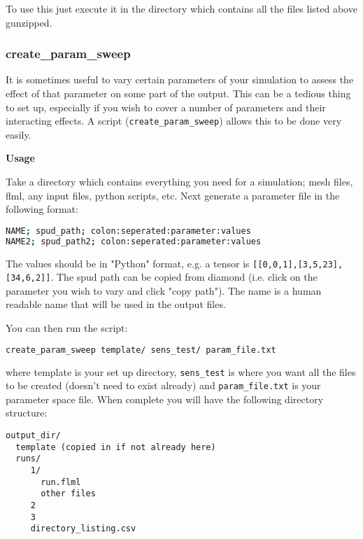 To use this just execute it in the directory which contains all the files listed above gunzipped.

\subsubsection{create\_param\_sweep}
\label{sec:create_param_sweep}

It is sometimes useful to vary certain parameters of your simulation to assess the effect of 
that parameter on some part of the output. This can be a tedious thing to set up, especially 
if you wish to cover a number of parameters and their interacting effects.
A script (\lstinline[language = Bash]+create_param_sweep+) allows this to be done very easily.

\textbf{Usage}

Take a directory which contains everything you need for a simulation; mesh files, 
flml, any input files, python scripts, etc. Next generate a parameter file in the following format:

\begin{lstlisting}[language = Bash]
NAME; spud_path; colon:seperated:parameter:values
NAME2; spud_path2; colon:seperated:parameter:values
\end{lstlisting}

The values should be in "Python" format, e.g. a tensor is 
\lstinline[language = Bash]+[[0,0,1],[3,5,23],[34,6,2]]+. 
The spud path can be copied from diamond (i.e. click on the parameter you wish to vary
and click "copy path"). The name is a human readable name that will be used in the output files.

You can then run the script:

\begin{lstlisting}[language = Bash]
create_param_sweep template/ sens_test/ param_file.txt 
\end{lstlisting}

where template is your set up directory, \lstinline[language = Bash]+sens_test+ 
is where you want all the files to be created 
(doesn't need to exist already) and \lstinline[language = Bash]+param_file.txt+ is your parameter space file.
When complete you will have the following directory structure:

\begin{lstlisting}
output_dir/
  template (copied in if not already here)
  runs/
     1/
       run.flml
       other files
     2
     3
     directory_listing.csv
\end{lstlisting}

